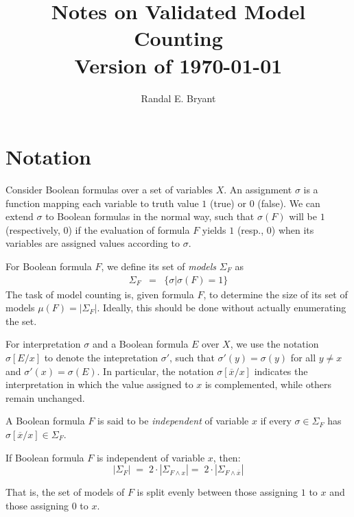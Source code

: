 \documentclass{llncs}
\title{Notes on Validated Model Counting \\ Version of \today}
\author{Randal E. Bryant}
\institute{
Computer Science Department \\
Carnegie Mellon University, Pittsburgh, PA, United States
}
\newcommand{\tautology}{1}
\newcommand{\nil}{0}
\newcommand{\obar}[1]{\overline{#1}}
\newcommand{\interp}{\sigma}
\newcommand{\interpset}[1]{\Sigma_{#1}}
\newcommand{\mcount}{\mu}
\newcommand{\subs}[2]{[#2/#1]}
\newcommand{\subsflip}[1]{\subs{#1}{\obar{#1}}}
\begin{document}
\maketitle

\section{Notation}

Consider Boolean formulas over a set of variables $X$.  An
assignment $\interp$ is a function mapping each variable to 
truth value $\tautology$ (true) or $\nil$ (false).  We can extend
$\interp$ to Boolean formulas in the normal way, such that
$\interp(F)$ will be $\tautology$ (respectively, $\nil$) if the
evaluation of formula $F$ yields $\tautology$ (resp., $\nil$) when its
variables are assigned values according to $\interp$.

For Boolean formula $F$, we define its set of {\em models} $\interpset{F}$ as
\begin{eqnarray}
\interpset{F} & = & \{ \interp | \interp(F) = \tautology \}
\end{eqnarray}
The task of model counting is, given formula $F$, to determine the size of its set of models
$\mcount(F) = |\interpset{F}|$.  Ideally, this should be done without actually enumerating the set.

For interpretation $\interp$ and a Boolean formula $E$ over $X$, we
use the notation $\interp\subs{x}{E}$ to denote the intepretation
$\interp'$, such that $\interp'(y) = \interp(y)$ for all $y \not = x$
and $\interp'(x) = \interp(E)$.  In particular, the notation
$\interp\subsflip{x}$ indicates the interpretation in which the value
assigned to $x$ is complemented, while others remain unchanged.

A Boolean formula $F$ is said to be {\em independent} of variable $x$
if every $\interp \in \interpset{F}$ has $\interp\subsflip{x} \in
\interpset{F}$.

\begin{lemma}
\label{lemma:independent:split}
If Boolean formula $F$ is independent of variable $x$, then:
\begin{equation}
|\interpset{F}| \; = \; 2\cdot |\interpset{F\land x}| = \; 2\cdot |\interpset{F\land \obar{x}}| \label{eqn:independent}
\end{equation}  
\end{lemma}  
That is, the set of models of $F$ is split evenly between
those assigning $\tautology$ to $x$ and those assigning $\nil$ to $x$.
\end{document}
